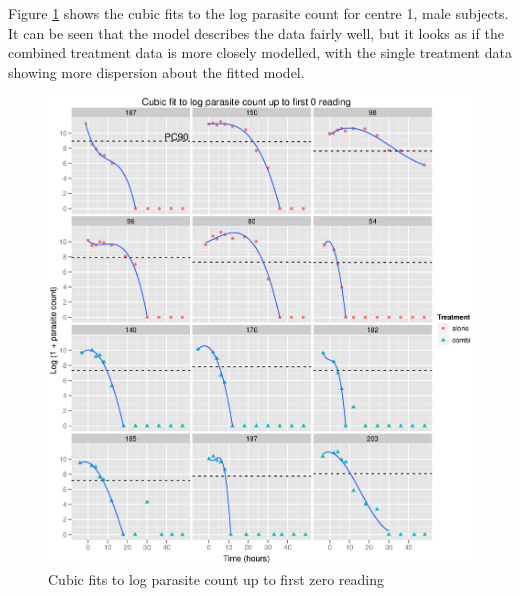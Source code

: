 Figure \ref{cubics} shows the cubic fits to the log parasite count for centre 1, male subjects. It can be seen that the model describes the data fairly well, but it looks as if the combined treatment data is more closely modelled, with the single treatment data showing more dispersion about the fitted model. 
\begin{figure}[p]
\includegraphics[width=6.1in]{cubics.eps} 
\caption{Cubic fits to log parasite count up to first zero reading}\label{cubics}
\end{figure}

